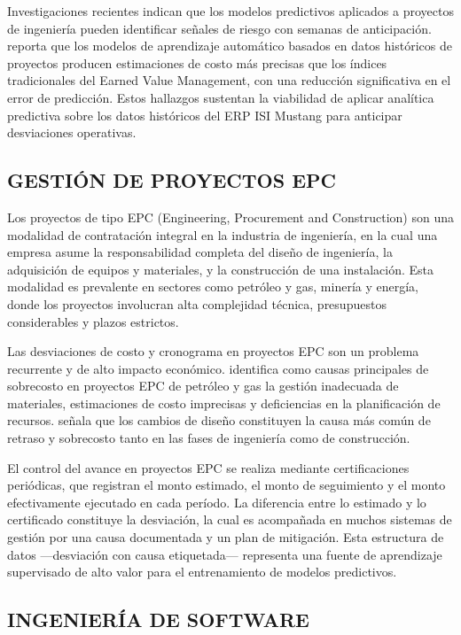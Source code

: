 \documentclass{univalle-perfil}
\begin{document}
Investigaciones recientes indican que los modelos predictivos aplicados a proyectos de ingeniería pueden identificar señales de riesgo con semanas de anticipación. \textcite{MLcostForecasting2022} reporta que los modelos de aprendizaje automático basados en datos históricos de proyectos producen estimaciones de costo más precisas que los índices tradicionales del Earned Value Management, con una reducción significativa en el error de predicción. Estos hallazgos sustentan la viabilidad de aplicar analítica predictiva sobre los datos históricos del ERP ISI Mustang para anticipar desviaciones operativas.

\subsection{GESTIÓN DE PROYECTOS EPC}

Los proyectos de tipo EPC (Engineering, Procurement and Construction) son una modalidad de contratación integral en la industria de ingeniería, en la cual una empresa asume la responsabilidad completa del diseño de ingeniería, la adquisición de equipos y materiales, y la construcción de una instalación. Esta modalidad es prevalente en sectores como petróleo y gas, minería y energía, donde los proyectos involucran alta complejidad técnica, presupuestos considerables y plazos estrictos.

Las desviaciones de costo y cronograma en proyectos EPC son un problema recurrente y de alto impacto económico. \textcite{CostOverrunsEPC2022} identifica como causas principales de sobrecosto en proyectos EPC de petróleo y gas la gestión inadecuada de materiales, estimaciones de costo imprecisas y deficiencias en la planificación de recursos. \textcite{EPCleadingIndicators2018} señala que los cambios de diseño constituyen la causa más común de retraso y sobrecosto tanto en las fases de ingeniería como de construcción.

El control del avance en proyectos EPC se realiza mediante certificaciones periódicas, que registran el monto estimado, el monto de seguimiento y el monto efectivamente ejecutado en cada período. La diferencia entre lo estimado y lo certificado constituye la desviación, la cual es acompañada en muchos sistemas de gestión por una causa documentada y un plan de mitigación. Esta estructura de datos —desviación con causa etiquetada— representa una fuente de aprendizaje supervisado de alto valor para el entrenamiento de modelos predictivos.

\subsection{INGENIERÍA DE SOFTWARE}
\end{document}
